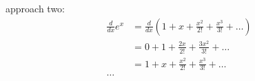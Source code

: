 \documentclass[letterpaper, landscape]{exam}
\begin{document}
  approach two:
  \begin{align*}
    \frac{d}{dx} e^x &= \frac{d}{dx} \left( 1 + x + \frac{x^2}{2!} + \frac{x^3}{3!} + \ldots  \right) \\
                     &= 0 + 1 + \frac{2 x}{2!} + \frac{3x^2}{3!} + \ldots \\
                     &= 1 + x + \frac{x^2}{2!} + \frac{x^3}{3!} + \ldots \\
    \ldots
  \end{align*}
  
\end{document}
